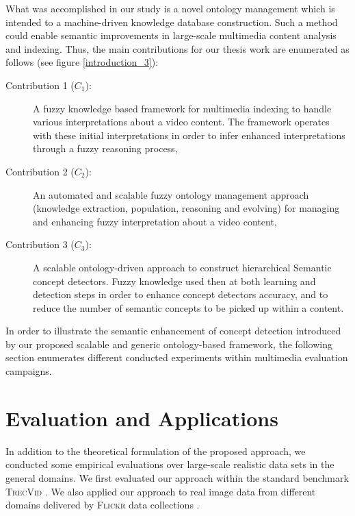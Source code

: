 	What was accomplished in our study is a novel ontology management which is intended to a machine-driven
	knowledge database construction. Such a method could enable semantic improvements in large-scale multimedia 
	content analysis and indexing. Thus, the main contributions for our thesis work are enumerated as follows 
	(see figure \ref{introduction_3}):
		\begin{description}
			\item[Contribution 1 ($C_ {1}$):] A fuzzy knowledge based framework for multimedia
				indexing to handle various interpretations about a video content. The framework 
				operates with these initial interpretations in order to infer enhanced interpretations 
				through a fuzzy reasoning process,
			\item[Contribution 2 ($C_ {2}$):] An automated and scalable fuzzy ontology management approach 
				(knowledge extraction, population, reasoning and evolving) for managing and 
				enhancing fuzzy interpretation about a video content,
			\item[Contribution 3 ($C_ {3}$):] A scalable ontology-driven approach to construct hierarchical 
				Semantic concept detectors. Fuzzy knowledge  used then at both learning and detection
				steps in order to enhance concept detectors accuracy, and to reduce the number of 
				semantic concepts to be picked up within a content.
		 \end{description}

	In order to illustrate the semantic enhancement of concept detection introduced by our proposed scalable 
	and generic ontology-based framework, the following section enumerates  different conducted experiments 
	within multimedia evaluation campaigns.

	\section{Evaluation and Applications}
	In addition to the theoretical formulation of the proposed approach, we conducted some 
	empirical evaluations over large-scale realistic data sets in the general domains. 
	We first evaluated our approach within the standard benchmark 
	\textsc{\gls{TrecVid}} \citep{Smeaton2006,Smeaton2009,Over2014}. We also applied our 
	approach to real image data from different domains delivered by \textsc{Flickr} data 
	collections \citep{Wang2009}.

